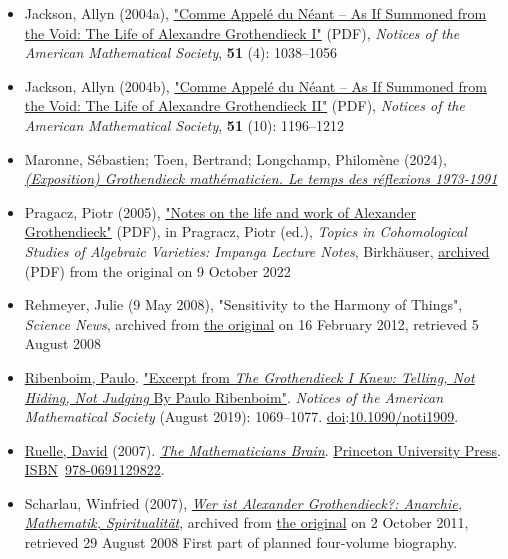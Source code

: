\begin{itemize}
\item
  Jackson, Allyn (2004a), \href{https://www.ams.org/notices/200409/fea-grothendieck-part1.pdf}{"Comme Appelé du Néant -- As If Summoned from the Void: The Life of Alexandre Grothendieck I"} {(PDF)}, \emph{Notices of the American Mathematical Society}, \textbf{51} (4): {1038--}1056{}
\item
  Jackson, Allyn (2004b), \href{https://www.ams.org/notices/200410/fea-grothendieck-part2.pdf}{"Comme Appelé du Néant -- As If Summoned from the Void: The Life of Alexandre Grothendieck II"} {(PDF)}, \emph{Notices of the American Mathematical Society}, \textbf{51} (10): {1196--}1212{}
\item
  Maronne, Sébastien; Toen, Bertrand; Longchamp, Philomène (2024), \href{https://hal.science/hal-04901028}{\emph{(Exposition) Grothendieck mathématicien. Le temps des réflexions 1973-1991}}{}
\item
  Pragacz, Piotr (2005), \href{http://www.landsburg.com/grothendieck/pragasz.pdf}{"Notes on the life and work of Alexander Grothendieck"} {(PDF)}, in Pragracz, Piotr (ed.), \emph{Topics in Cohomological Studies of Algebraic Varieties: Impanga Lecture Notes}, Birkhäuser, \href{https://ghostarchive.org/archive/20221009/http://www.landsburg.com/grothendieck/pragasz.pdf}{archived} {(PDF)} from the original on 9 October 2022{}
\item
  Rehmeyer, Julie (9 May 2008), "Sensitivity to the Harmony of Things", \emph{Science News}, archived from \href{http://www.sciencenews.org/view/generic/id/31898/title/Sensitivity_to_the_harmony_of_things}{the original} on 16 February 2012{, retrieved {5 August} 2008}{}
\item
  \href{https://en.wikipedia.org/wiki/Paulo_Ribenboim}{Ribenboim, Paulo}. \href{https://doi.org/10.1090\%2Fnoti1909}{"Excerpt from \emph{The Grothendieck I Knew: Telling, Not Hiding, Not Judging} By Paulo Ribenboim"}. \emph{Notices of the American Mathematical Society} (August 2019): {1069--}1077. \href{https://en.wikipedia.org/wiki/Doi_(identifier)}{doi}:{\href{https://doi.org/10.1090\%2Fnoti1909}{10.1090/noti1909}}.{}
\item
  \href{https://en.wikipedia.org/wiki/David_Ruelle}{Ruelle, David} (2007). \href{https://books.google.com/books?id=B3A1bjOkOaEC}{\emph{The Mathematician\textquotesingle s Brain}}. \href{https://en.wikipedia.org/wiki/Princeton_University_Press}{Princeton University Press}. \href{https://en.wikipedia.org/wiki/ISBN_(identifier)}{ISBN}{~}\href{https://en.wikipedia.org/wiki/Special:BookSources/978-0691129822}{978-0691129822}.{}
\item
  Scharlau, Winfried (2007), \href{https://web.archive.org/web/20111002142106/http://www.scharlau-online.de/ag_1.html}{\emph{Wer ist Alexander Grothendieck?: Anarchie, Mathematik, Spiritualität}}, archived from \href{http://www.scharlau-online.de/ag_1.html}{the original} on 2 October 2011{, retrieved {29 August} 2008}{} First part of planned four-volume biography.


\end{itemize}
